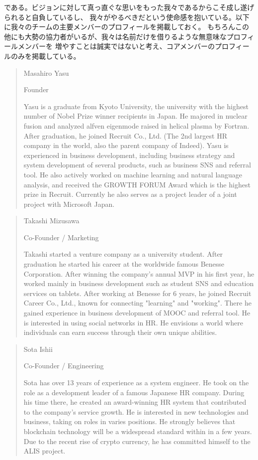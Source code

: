 \documentclass{jsarticle}
\begin{document}
である。ビジョンに対して真っ直ぐな思いをもった我々であるからこそ成し遂げられると自負しているし、
我々がやるべきだという使命感を抱いている。以下に我々のチームの主要メンバーのプロフィールを掲載しておく。
もちろんこの他にも大勢の協力者がいるが、我々は名前だけを借りるような無意味なプロフィールメンバーを
増やすことは誠実ではないと考え、コアメンバーのプロフィールのみを掲載している。
\begin{quote}
Masahiro Yasu

Founder

Yasu is a graduate from Kyoto University, the university with the highest
number of Nobel Prize winner recipients in Japan. He majored in nuclear fusion and 
analyzed alfven eigenmode raised in helical plasma by Fortran. After graduation, 
he joined Recruit Co., Ltd. (The 2nd largest HR company in the world, also 
the parent company of Indeed). Yasu is experienced in business development, 
including business strategy and system development of several products, 
such as business SNS and referral tool. He also actively worked on machine 
learning and natural language analysis, and received the GROWTH FORUM 
Award which is the highest prize in Recruit. Currently he also serves as a 
project leader of a joint project with Microsoft Japan.
\end{quote}
\begin{quote}
Takashi Mizusawa

Co-Founder / Marketing

Takashi started a venture company as a university student. After graduation 
he started his career at the worldwide famous Benesse Corporation. After winning 
the company's annual MVP in his first year, he worked mainly in business 
development such as student SNS and education services on tablets. After working 
at Benesse for 6 years, he joined Recruit Career Co., Ltd., known for connecting 
"learning" and "working". There he gained experience in business development of 
MOOC and referral tool. He is interested in using social networks in HR. 
He envisions a world where individuals can earn success through their own unique abilities.
\end{quote}
\begin{quote}
Sota Ishii

Co-Founder / Engineering

Sota has over 13 years of experience as a system engineer. He took on the 
role as a development leader of a famous Japanese HR company. During his 
time there, he created an award-winning HR system that contributed to the company's 
service growth. He is interested in new technologies and business, taking on roles in 
varies positions. He strongly believes that blockchain technology will be a widespread 
standard within in a few years. Due to the recent rise of crypto currency, he has 
committed himself to the ALIS project.
\end{quote}
\end{document}
